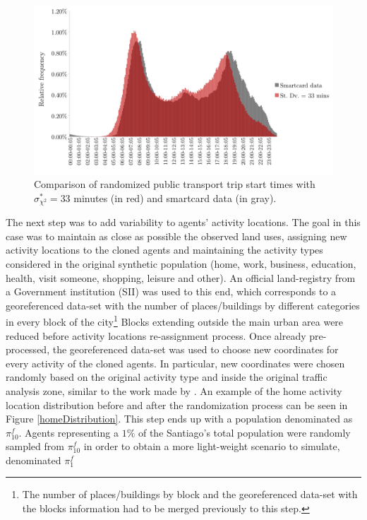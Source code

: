 \documentclass[Journal,letterpaper]{ascelike-new}
\begin{document}
\begin{figure}
    \centering
    \includegraphics[scale=0.4]{images/1_CHI33SD.pdf}
    \caption{Comparison of randomized public transport trip start times with $\sigma_{\chi^2}^{*}=33$ minutes (in red) and smartcard data (in gray).}
    \label{histogram_comparition}
\end{figure}
The next step was to add variability to agents' activity locations. The goal in this case was to maintain as close as possible the observed land uses, assigning new activity locations to the cloned agents and maintaining the activity types considered in the original synthetic population (home, work, business, education, health, visit someone, shopping, leisure and other). An official land-registry from a Government institution (SII) was used to this end, which corresponds to a georeferenced data-set with the number of places/buildings by different categories in every block of the city\footnote{The number of places/buildings by block and the georeferenced data-set with the blocks information had to be merged previously to this step.} Blocks extending outside the main urban area were reduced before activity locations re-assignment process. Once already pre-processed, the georeferenced data-set was used to choose new coordinates for every activity of the cloned agents. In particular, new coordinates were chosen randomly based on the original activity type and inside the original traffic analysis zone, similar to the work made by \cite{kickhofer2013rising}. An example of the home activity location distribution before and after the randomization process can be seen in Figure \ref{homeDistribution}. This step ends up with a population denominated as $\pi_{10}^{f}$. Agents representing a $1\%$ of the Santiago's total population were randomly sampled from $\pi_{10}^{f}$ in order to obtain a more light-weight scenario to simulate, denominated $\pi_{1}^{f}$
\end{document}
